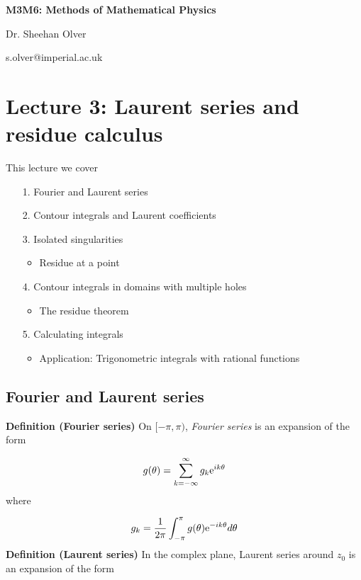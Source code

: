 \documentclass[12pt,a4paper]{article}
\def\E{ {\rm e} }
\begin{document}
\textbf{M3M6: Methods of Mathematical Physics}

Dr. Sheehan Olver

s.olver@imperial.ac.uk

\section{Lecture 3: Laurent series and residue calculus}
This lecture we cover

\begin{itemize}
\item[1. ] Fourier and Laurent series


\item[2. ] Contour integrals and Laurent coefficients


\item[3. ] Isolated singularities

\begin{itemize}
\item Residue at a point

\end{itemize}

\item[4. ] Contour integrals in domains with multiple holes

\begin{itemize}
\item The residue theorem

\end{itemize}

\item[5. ] Calculating integrals

\begin{itemize}
\item Application: Trigonometric integrals with rational functions

\end{itemize}
\end{itemize}
\subsection{Fourier and Laurent series}
\textbf{Definition (Fourier series)} On $[-\pi, \pi)$,  \emph{Fourier series} is an expansion of the form

\[
    g(\theta) = \sum_{k=-\infty}^\infty g_k \E^{i k \theta}
\]
where

\[
g_k = {1\over 2 \pi} \int_{-\pi}^\pi g(\theta) \E^{-i k \theta} d \theta
\]
\textbf{Definition (Laurent series)} In the complex plane, Laurent series around $z_0$ is an expansion of the form 
\end{document}
